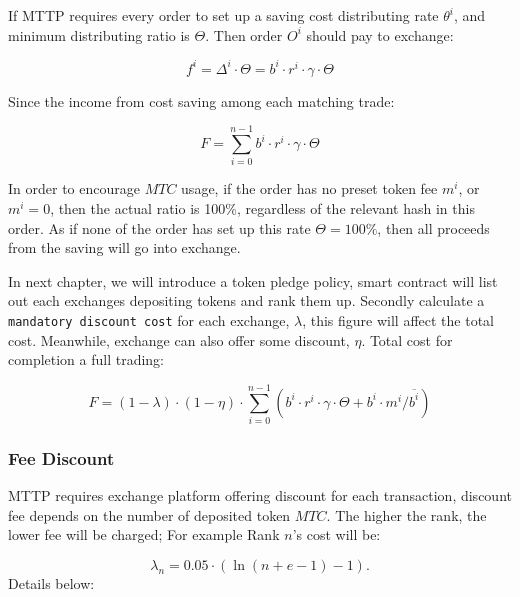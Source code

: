 \documentclass[UTF8,nofonts]{article}
\begin{document}
If MTTP requires every order to set up a saving cost distributing rate $\theta^i$, and minimum distributing ratio is $\Theta$. Then order $O^i$ should pay to exchange: 


\begin{equation*}
f^i = \Delta^i \cdot \Theta = b^i \cdot r^i \cdot \gamma \cdot \Theta
\end{equation*}

Since the income from cost saving among each matching trade:

\begin{equation*}
F = \sum^{n-1}_{i=0} b^i \cdot r^i \cdot \gamma \cdot \Theta
\end{equation*}

In order to encourage $MTC$ usage,  if the order has no preset token fee $m^i$, or $m^i=0$, then the actual ratio is 100\%,  regardless of the relevant hash in this order. As if none of the order has set up this rate $\Theta=100\%$,  then all proceeds from the saving will go into exchange.

In next chapter,  we will introduce a token pledge policy,  smart contract will list out each exchanges depositing tokens and rank them up. Secondly calculate a \texttt{mandatory discount cost} for each exchange, $\lambda$, this figure will affect the total cost. Meanwhile, exchange can also offer some discount, $\eta$. Total cost for completion a full trading: 

\begin{equation*}
F =(1-\lambda)\cdot (1-\eta) \cdot \sum^{n-1}_{i=0} (b^i \cdot r^i \cdot \gamma \cdot \Theta + b^i \cdot m^i / \overline{b^i})
\end{equation*}


\subsubsection{Fee Discount}
MTTP requires exchange platform offering discount for each transaction,  discount fee depends on the number of deposited token $MTC$. The higher the rank,  the lower fee will be charged; For example Rank $n$'s cost will be:

$$\lambda_{n} = 0.05\cdot(\ln (n+e-1) - 1)\text{.}$$
Details below:
\end{document}

